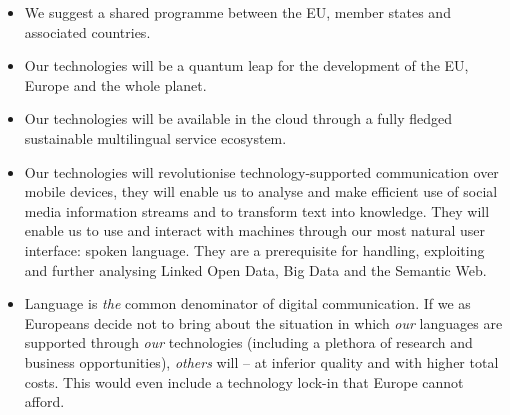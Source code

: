 \documentclass[10pt, plain]{../../metanetpaper}
\begin{document}
\begin{multicols}{2}
\begin{itemize}
  \item We suggest a shared programme between the EU, member states and associated countries.
  \item Our technologies will be a quantum leap for the development of the EU, Europe and the whole planet.
  \item Our technologies will be available in the cloud through a fully fledged sustainable multilingual service ecosystem.
  \item Our technologies will revolutionise technology-supported communication over mobile devices, they will enable us to analyse and make efficient use of social media information streams and to transform text into knowledge. They will enable us to use and interact with machines through our most natural user interface: spoken language. They are a prerequisite for handling, exploiting and further analysing Linked Open Data, Big Data and the Semantic Web.
  \item Language is \emph{the} common denominator of digital communication. If we as Europeans decide not to bring about the situation in which \emph{our} languages are supported through \emph{our} technologies (including a plethora of research and business opportunities), \emph{others} will -- at inferior quality and with higher total costs. This would even include a technology lock-in that Europe cannot afford.
  \end{itemize}
\end{multicols}


{}
\end{document}
